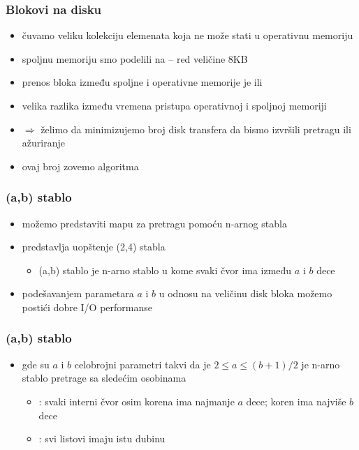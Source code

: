 \documentclass[compress,aspectratio=169]{beamer}
\begin{document}
\begin{frame}[fragile]
  \frametitle{Blokovi na disku}
  \begin{itemize}
    \item čuvamo veliku kolekciju elemenata koja ne može stati u 
    operativnu memoriju
    \item spoljnu memoriju smo podelili na  -- red 
      veličine 8KB
    \item prenos bloka između spoljne i operativne memorije je 
     ili 
    \item velika razlika između vremena pristupa operativnoj i spoljnoj 
    memoriji
    \item $\Rightarrow$ želimo da minimizujemo broj disk transfera da
    bismo izvršili pretragu ili ažuriranje
    \item ovaj broj zovemo  algoritma
  \end{itemize}
\end{frame}

\begin{frame}[fragile]
  \frametitle{(a,b) stablo}
  \begin{itemize}
    \item možemo predstaviti mapu za pretragu pomoću n-arnog stabla
    \item {} predstavlja uopštenje (2,4) stabla
    \begin{itemize}
      \item (a,b) stablo je n-arno stablo u kome svaki čvor ima između
      $a$ i $b$ dece
    \end{itemize}
    \item podešavanjem parametara $a$ i $b$ u odnosu na veličinu disk 
    bloka možemo postići dobre I/O performanse
  \end{itemize}
\end{frame}

\begin{frame}[fragile]
  \frametitle{(a,b) stablo}
  \begin{itemize}
    \item {} gde su $a$ i $b$ celobrojni parametri 
    takvi da je $2\leq a\leq (b+1)/2$ je n-arno stablo pretrage sa
    sledećim osobinama
    \begin{itemize}
      \item {}: svaki interni čvor osim korena ima 
      najmanje $a$ dece; koren ima najviše $b$ dece
      \item {}: svi listovi imaju istu dubinu
    \end{itemize}
  \end{itemize}
\end{frame}
\end{document}
